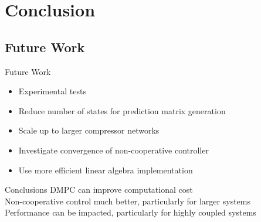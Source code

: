 \section{Conclusion}
\subsection{Future Work}

\begin{frame}{Future Work}
  \begin{itemize}
    \item Experimental tests
    \item Reduce number of states for prediction matrix generation
    \item Scale up to larger compressor networks
    \item Investigate convergence of non-cooperative controller
    \item Use more efficient linear algebra implementation
  \end{itemize}
\end{frame}

\begin{frame}{Conclusions}
  DMPC can improve computational cost\\
  Non-cooperative control much better, particularly for larger systems\\
  Performance can be impacted, particularly for highly coupled systems
\end{frame}



